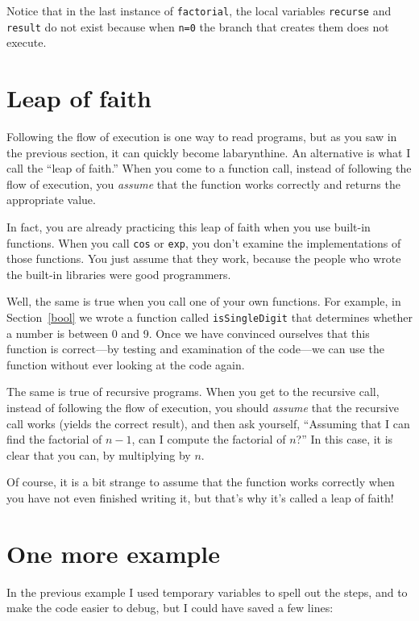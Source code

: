Notice that in the last instance of {\tt factorial}, the local
variables {\tt recurse} and {\tt result} do not exist because
when {\tt n=0} the branch that creates them does not execute.

\section{Leap of faith}

Following the flow of execution is one way to read programs, but as
you saw in the previous section, it can quickly become labarynthine.
An alternative is what I call the ``leap of faith.''  When you come to
a function call, instead of following the flow of execution, you
{\em assume} that the function works correctly and returns the
appropriate value.

In fact, you are already practicing this leap of faith
when you use built-in functions.  When you call {\tt cos}
or {\tt exp}, you don't examine the implementations of 
those functions.  You just assume that they work, because the people
who wrote the built-in libraries were good programmers.

Well, the same is true when you call one of your own functions.
For example, in Section~\ref{bool} we wrote a function called
{\tt isSingleDigit} that determines whether a number is between
0 and 9.  Once we have convinced ourselves that this function
is correct---by testing and examination of the code---we can
use the function without ever looking at the code again.

The same is true of recursive programs.  When you get to the recursive
call, instead of following the flow of execution, you should {\em
assume} that the recursive call works (yields the correct result), and
then ask yourself, ``Assuming that I can find the factorial of $n-1$,
can I compute the factorial of $n$?''  In this case, it is clear that
you can, by multiplying by $n$.

Of course, it is a bit strange to assume that the function works
correctly when you have not even finished writing it, but that's why
it's called a leap of faith!

\section{One more example}

In the previous example I used temporary variables to spell out the
steps, and to make the code easier to debug, but I could have saved a
few lines:

